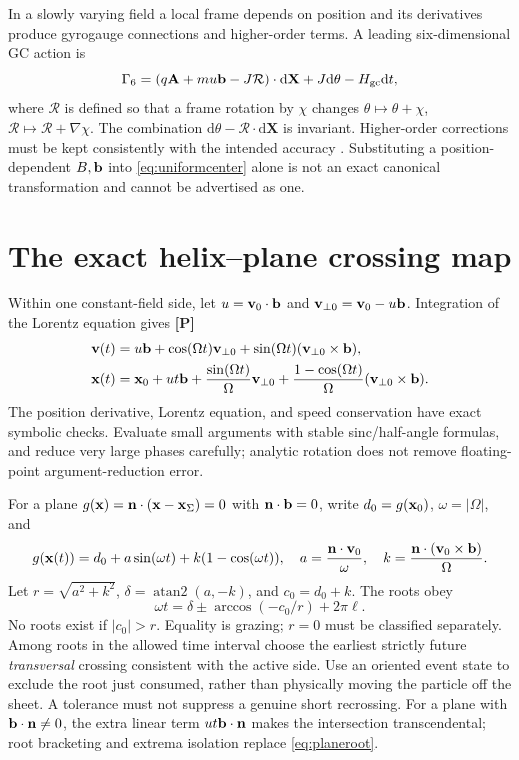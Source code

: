 \documentclass[10pt,a4paper]{article}
\newcommand{\X}{\mathbf X}\newcommand{\n}{\mathbf n}
\newcommand{\A}{\mathbf A}\newcommand{\dd}{\mathrm d}
\newcommand{\proved}{\textbf{[P]}}
\begin{document}
In a slowly varying field a local frame depends on position and its derivatives produce gyrogauge connections and higher-order terms. A leading six-dimensional GC action is
\begin{equation}\label{eq:gc6}
 \Gamma_6=(q\A+m u\bunit-J\mathcal R)\cdot\dd\X+J\dd\theta-H_{\rm gc}\dd t,
\end{equation}
where $\mathcal R$ is defined so that a frame rotation by $\chi$ changes $\theta\mapsto\theta+\chi$, $\mathcal R\mapsto\mathcal R+\nabla\chi$. The combination $\dd\theta-\mathcal R\cdot\dd\X$ is invariant. Higher-order corrections must be kept consistently with the intended accuracy \cite{carybrizard}. Substituting a position-dependent $B,\mathbf b$ into \eqref{eq:uniformcenter} alone is not an exact canonical transformation and cannot be advertised as one.

\section{The exact helix--plane crossing map}
\label{sec:helix}
Within one constant-field side, let $u=\mathbf v_0\cdot\mathbf b$ and $\mathbf v_{\perp0}=\mathbf v_0-u\mathbf b$. Integration of the Lorentz equation gives \proved{}
\begin{align}\label{eq:helix}
 \mathbf v(t)&=u\mathbf b+\cos(\Omega t)\mathbf v_{\perp0}
                  +\sin(\Omega t)(\mathbf v_{\perp0}\times\mathbf b),\\
 \mathbf x(t)&=\mathbf x_0+ut\mathbf b+\frac{\sin(\Omega t)}{\Omega}\mathbf v_{\perp0}
       +\frac{1-\cos(\Omega t)}{\Omega}(\mathbf v_{\perp0}\times\mathbf b).
\end{align}
The position derivative, Lorentz equation, and speed conservation have exact symbolic checks. Evaluate small arguments with stable sinc/half-angle formulas, and reduce very large phases carefully; analytic rotation does not remove floating-point argument-reduction error.

For a plane $g(\x)=\n\cdot(\x-\x_\Sigma)=0$ with $\n\cdot\bunit=0$, write $d_0=g(\mathbf x_0)$, $\omega=|\Omega|$, and
\begin{equation}\label{eq:plane}
 g(\x(t))=d_0+a\sin(\omega t)+k(1-\cos(\omega t)),\quad
 a=\frac{\n\cdot\v_0}{\omega},\quad
 k=\frac{\n\cdot(\v_0\times\bunit)}{\Omega}.
\end{equation}
Let $r=\sqrt{a^2+k^2}$, $\delta=\operatorname{atan2}(a,-k)$, and $c_0=d_0+k$. The roots obey
\begin{equation}\label{eq:planeroot}
 \omega t=\delta\pm\arccos(-c_0/r)+2\pi\ell.
\end{equation}
No roots exist if $|c_0|>r$. Equality is grazing; $r=0$ must be classified separately. Among roots in the allowed time interval choose the earliest strictly future \emph{transversal} crossing consistent with the active side. Use an oriented event state to exclude the root just consumed, rather than physically moving the particle off the sheet. A tolerance must not suppress a genuine short recrossing. For a plane with $\bunit\cdot\n\ne0$, the extra linear term $ut\bunit\cdot\n$ makes the intersection transcendental; root bracketing and extrema isolation replace \eqref{eq:planeroot}.
\end{document}
